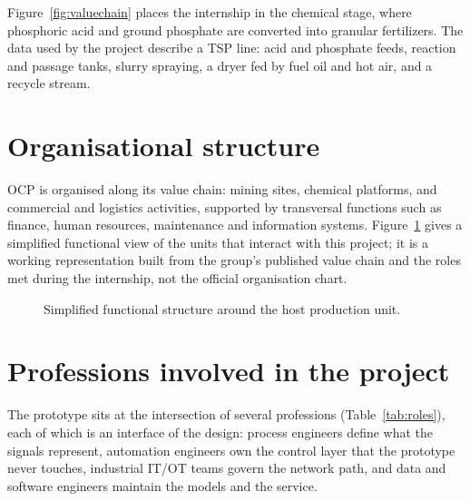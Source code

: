 Figure~\ref{fig:valuechain} places the internship in the chemical stage, where phosphoric acid and ground phosphate are converted into granular fertilizers. The data used by the project describe a TSP line: acid and phosphate feeds, reaction and passage tanks, slurry spraying, a dryer fed by fuel oil and hot air, and a recycle stream.

\section{Organisational structure}
OCP is organised along its value chain: mining sites, chemical platforms, and commercial and logistics activities, supported by transversal functions such as finance, human resources, maintenance and information systems. Figure~\ref{fig:org} gives a simplified functional view of the units that interact with this project; it is a working representation built from the group's published value chain and the roles met during the internship, not the official organisation chart.

\begin{figure}[!htbp]\centering
{}
\caption{Simplified functional structure around the host production unit.}\label{fig:org}
\end{figure}

\section{Professions involved in the project}
The prototype sits at the intersection of several professions (Table~\ref{tab:roles}), each of which is an interface of the design: process engineers define what the signals represent, automation engineers own the control layer that the prototype never touches, industrial IT/OT teams govern the network path, and data and software engineers maintain the models and the service.

